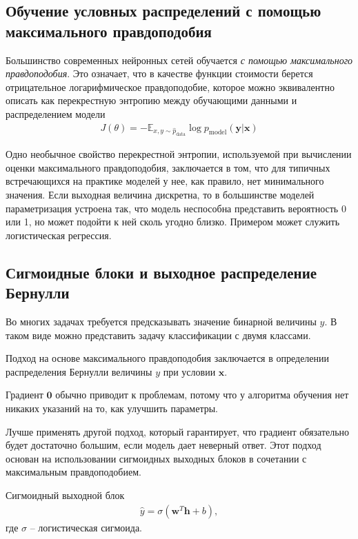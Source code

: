 \documentclass[%
	11pt,
	a4paper,
	utf8,
]{article}
\begin{document}
\subsection{Обучение условных распределений с помощью максимального правдоподобия}

Большинство современных нейронных сетей обучается \emph{с помощью максимального правдоподобия}. Это означает, что {\color{blue}в качестве функции стоимости берется отрицательное логарифмическое правдоподобие}, которое можно эквивалентно описать как перекрестную энтропию между обучающими данными и распределением модели
\begin{align*}
	J(\theta) = - \mathbb{E}_{x, y \sim \hat{p}_{\text{data}}} \log p_{\text{model}} (\mathbf{y} | \mathbf{x})
\end{align*}

Одно необычное свойство перекрестной энтропии, используемой при вычислении оценки максимального правдоподобия, заключается в том, что для типичных встречающихся на практике моделей у нее, как правило, нет минимального значения. Если выходная величина дискретна, то в большинстве моделей параметризация устроена так, что модель неспособна представить вероятность 0 или 1, но может подойти к ней сколь угодно близко. Примером может служить логистическая регрессия.

\subsection{Сигмоидные блоки и выходное распределение Бернулли}

Во многих задачах требуется предсказывать значение бинарной величины $ y $. В таком виде можно представить задачу классификации с двумя классами.

Подход на основе максимального правдоподобия заключается в определении распределения Бернулли величины $ y $ при условии $ \mathbf{x} $.

{\color{blue}Градиент $ \mathbf{0} $ обычно приводит к проблемам, потому что у алгоритма обучения нет никаких указаний на то, как улучшить параметры.}

Лучше применять другой подход, который гарантирует, что градиент обязательно будет достаточно большим, если модель дает неверный ответ. Этот подход основан на использовании сигмоидных выходных блоков в сочетании с максимальным правдоподобием.

Сигмоидный выходной блок
\begin{align*}
	\hat{y} = \sigma (\mathbf{w}^T \mathbf{h} + b),
\end{align*}
где $ \sigma $ -- логистическая сигмоида.
\end{document}
